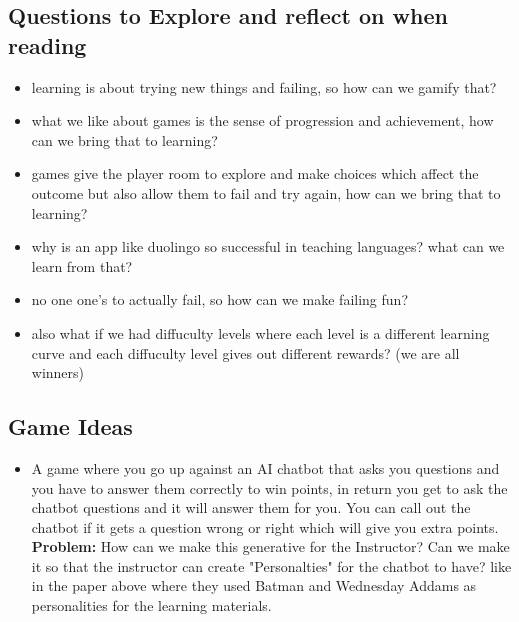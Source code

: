 \documentclass{article}
\begin{document}
\subsection{Questions to Explore and reflect on when reading}
\begin{itemize}
    \item learning is about trying new things and failing, so how can we gamify that?
    \item what we like about games is the sense of progression and achievement, how can we bring that to learning?
    \item games give the player room to explore and make choices which affect the outcome but also allow them to fail and try again, how can we bring that to learning?
    \item why is an app like duolingo so successful in teaching languages? what can we learn from that?
    \item no one one's to actually fail, so how can we make failing fun?
    \item also what if we had diffuculty levels where each level is a different learning curve and each diffuculty level gives out different rewards? (we are all winners)
\end{itemize}

\subsection{Game Ideas}
\begin{itemize}
    \item A game where you go up against an AI chatbot that asks you questions and you have to answer them correctly to win points, 
    in return you get to ask the chatbot questions and it will answer them for you. You can call out the chatbot if it gets a question wrong or right which will give you extra points. 
    \textbf{Problem:} How can we make this generative for the Instructor? Can we make it so that the instructor can create "Personalties" for the chatbot to have? 
    like in the paper above where they used Batman and Wednesday Addams as personalities for the learning materials.
\end{itemize}
\end{document}
